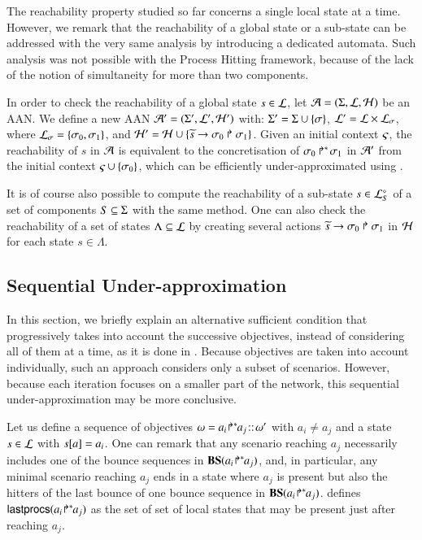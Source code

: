 \newcommand{\total}{\tau}
\newcommand{\reach}{\sigma}

The reachability property studied so far concerns a single local state at a time.
However, we remark that the reachability of a global state or a sub-state can be
addressed with the very same analysis by introducing a dedicated automata.
Such analysis was not possible with the Process Hitting framework,
because of the lack of the notion of simultaneity for more than two components.

In order to check the reachability of a global state $s \in \PHl$,
let $\PH = (\PHs, \PHl, \PHh)$ be an AAN.
We define a new AAN $\PH' = (\PHs', \PHl', \PHh')$ with:
$\PHs' = \PHs \cup \{ \reach \}$, $\PHl' = \PHl \times \PHl_\reach$,
where $\PHl_\reach = \{ \reach_0, \reach_1 \}$,
and $\PHh' = \PHh \cup \{ \PHhit{\toset{s}}{\reach_0}{\reach_1} \}$.
Given an initial context $\ctx$, the reachability of $s$ in $\PH$
is equivalent to the concretisation of $\PHobjp{\reach}{0}{1}$ in $\PH'$
from the initial context $\ctx \cup \{ \reach_0 \}$,
which can be efficiently under-approximated using .

It is of course also possible to compute the reachability
of a sub-state $s \in \PHsubl[\PHl]_S$ of a set of components $S \subseteq \PHs$
with the same method.
One can also check the reachability of a set of states $\Lambda \subseteq \PHl$
by creating several actions
$\PHhit{\toset{s}}{\reach_0}{\reach_1}$ in $\PHh$ for each state $s \in \Lambda$.



\subsection{Sequential Under-approximation}
\label{ssec:ordered-ua}

In this section, we briefly explain an alternative sufficient condition that
progressively takes into account the successive objectives, instead of
considering all of them at a time, as it is done in .
Because objectives are taken into account individually, such an approach
considers only a subset of scenarios.
However, because each iteration focuses on a smaller part of the network, this
sequential under-approximation may be more conclusive.

Let us define a sequence of objectives $\w=\obj{a_i}{a_j}\concat\w'$ with
$a_i\neq a_j$ and a state $s\in \PHl$ with $\get{s}{a}=a_i$.
One can remark that any scenario reaching $a_j$ necessarily includes one of the
bounce sequences in $\BS(\obj{a_i}{a_j})$, and, in particular,
any minimal scenario reaching $a_j$ ends in a state where $a_j$ is present but
also the hitters of the last bounce of one bounce sequence in $\BS(\obj{a_i}{a_j})$.
 defines $\lastprocs(\obj{a_i}{a_j})$ as the set of set of
local states that may be present just after reaching $a_j$.

